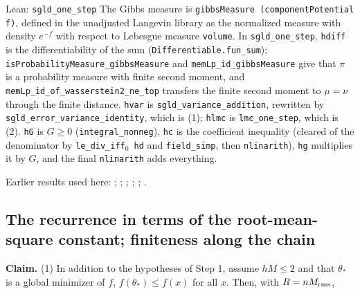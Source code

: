 \documentclass[11pt,a4paper]{report}
\begin{document}
\begin{leanbox}{Lean: \texttt{sgld\_\allowbreak{}one\_\allowbreak{}step}}
The Gibbs measure is \texttt{gibbs\allowbreak{}Measure (component\allowbreak{}Potential f)}, defined in the unadjusted Langevin library as the normalized measure with density \(e^{-f}\) with respect to Lebesgue measure \texttt{volume}. In \texttt{sgld\_\allowbreak{}one\_\allowbreak{}step}, \texttt{hdiff} is the differentiability of the sum (\texttt{Differentiable.\allowbreak{}fun\_\allowbreak{}sum}); \texttt{is\allowbreak{}Probability\allowbreak{}Measure\_\allowbreak{}gibbs\allowbreak{}Measure} and \texttt{mem\allowbreak{}Lp\_\allowbreak{}id\_\allowbreak{}gibbs\allowbreak{}Measure} give that \(\pi\) is a probability measure with finite second moment, and \texttt{mem\allowbreak{}Lp\_\allowbreak{}id\_\allowbreak{}of\_\allowbreak{}wasserstein2\_\allowbreak{}ne\_\allowbreak{}top} transfers the finite second moment to \(\mu=\nu\) through the finite distance. \texttt{hvar} is \texttt{sgld\_\allowbreak{}variance\_\allowbreak{}addition}, rewritten by \texttt{sgld\_\allowbreak{}error\_\allowbreak{}variance\_\allowbreak{}identity}, which is (1); \texttt{hlmc} is \texttt{lmc\_\allowbreak{}one\_\allowbreak{}step}, which is (2). \texttt{h\allowbreak{}G} is \(G\ge0\) (\texttt{integral\_\allowbreak{}nonneg}), \texttt{hc} is the coefficient inequality (cleared of the denominator by \texttt{le\_\allowbreak{}div\_\allowbreak{}iff\ensuremath{{}_{0}} hd} and \texttt{field\_\allowbreak{}simp}, then \texttt{nlinarith}), \texttt{hg} multiplies it by \(G\), and the final \texttt{nlinarith} adds everything.
\end{leanbox}


Earlier results used here: \cite[Section~3.17.3]{LangevinLean2026ULASC}; \cite[Section~3.17.4]{LangevinLean2026ULASC}; \cite[Section~3.21.1]{LangevinLean2026ULASC}; \cite[Section~3.26.13]{LangevinLean2026ULASC}; \cite[Section~3.26.15]{LangevinLean2026ULASC}; \cite[Section~3.26.3]{LangevinLean2026ULASC}.
\subsection{\texorpdfstring{The recurrence in terms of the root-mean-square constant; finiteness along the chain}{The recurrence in terms of the root-mean-square constant; finiteness along the chain}}
\label{report-step-AverageLMC-SGLDTheorem-lean-2}


\textbf{Claim.} (1) In addition to the hypotheses of Step 1, assume \(hM\le2\) and that \(\theta_*\) is a global minimizer of \(f\), \(f(\theta_*)\le f(x)\) for all \(x\). Then, with \(R=nM_{\rm rms}\),
\end{document}
